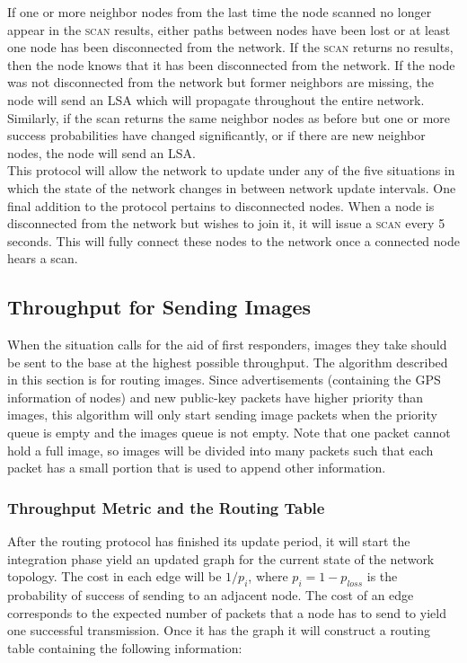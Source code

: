 \documentclass[letterpaper]{article}
\begin{document}
\noindent If one or more neighbor nodes from the last time the node scanned no longer appear in 
the \textsc{scan} results, either paths between nodes have been lost or at least one node has
been disconnected from the network. If the \textsc{scan} returns no results, then the node knows
that it has been disconnected from the network. If the node was not disconnected from the network
but former neighbors are missing, the node will send an LSA which will propagate throughout the
entire network. Similarly, if the scan returns the same neighbor nodes as before but one or more
success probabilities have changed significantly, or if there are new neighbor nodes, the node will
send an LSA.
\\

\noindent This protocol will allow the network to update under any of the five situations in which
the state of the network changes in between network update intervals. One final addition to the
protocol pertains to disconnected nodes. When a node is disconnected from the network but wishes to
join it, it will issue a \textsc{scan} every 5 seconds. This will fully connect these nodes to the
network once a connected node hears a scan. 

\subsection{Throughput for Sending Images}

When the situation calls for the aid of first responders, images they take should be sent to the base at
the highest possible throughput. The algorithm described in this section
is for routing images. Since advertisements (containing the GPS information of nodes) and
new public-key packets have higher priority than images, this algorithm will only start sending image
packets when the priority queue is empty and the images queue is not empty. Note that one packet
cannot hold a full image, so images will be divided into many packets such that each packet has a
small portion that is used to append other information.

\subsubsection{Throughput Metric and the Routing Table}

After the routing protocol has finished its update period, it will start the integration phase yield an
updated graph for the current state of the network topology. The cost in each edge will be $1/p_{i}$, 
where $p_{i} = 1 - p_{loss}$ is the probability of success of sending to an adjacent node. The cost of an
edge corresponds to the expected number of packets that a node has to send to yield one successful
transmission. Once it has the graph it will construct a routing table containing the following information:
\end{document}
